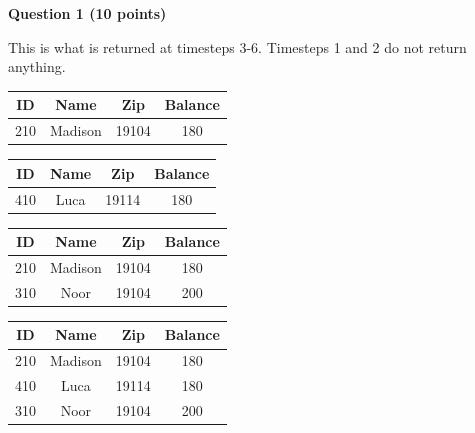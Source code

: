 \documentclass[12pt,letterpaper, onecolumn]{exam}
\begin{document}
\begin{questions}
  \question \textbf{Question 1 (10 points)}
  \begin{solution}
    This is what is returned at timesteps 3-6. Timesteps 1 and 2 do not return anything.
    \begin{center}
\begin{tabular}{|c|c|c|c|}
\hline
\textbf{ID} & \textbf{Name} & \textbf{Zip} & \textbf{Balance} \\
\hline
210 & Madison & 19104 & 180 \\
\hline
\end{tabular}

\begin{tabular}{|c|c|c|c|}
\hline
\textbf{ID} & \textbf{Name} & \textbf{Zip} & \textbf{Balance} \\
\hline
410 & Luca & 19114 & 180 \\
\hline
\end{tabular}

\begin{tabular}{|c|c|c|c|}
\hline
\textbf{ID} & \textbf{Name} & \textbf{Zip} & \textbf{Balance} \\
\hline
210 & Madison & 19104 & 180 \\
310 & Noor & 19104 & 200 \\
\hline
\end{tabular}

\begin{tabular}{|c|c|c|c|}
\hline
\textbf{ID} & \textbf{Name} & \textbf{Zip} & \textbf{Balance} \\
\hline
210 & Madison & 19104 & 180 \\
410 & Luca & 19114 & 180 \\
310 & Noor & 19104 & 200 \\
\hline
\end{tabular}


\end{center}
\end{solution}
\end{questions}
\end{document}
